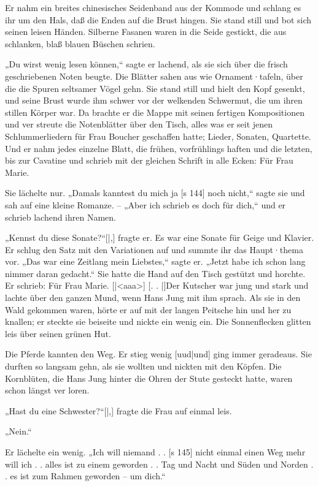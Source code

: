 Er nahm ein breites chinesisches Seidenband
aus der Kommode und schlang es ihr um den Hals,
daß die Enden auf die Brust hingen. Sie stand still
und bot sich seinen leisen Händen. Silberne Fasanen
waren in die Seide gestickt, die aus schlanken, blaß­
blauen Büschen schrien.

„Du wirst wenig lesen können,“ sagte er lachend,
als sie sich über die frisch geschriebenen Noten
beugte. Die Blätter sahen aus wie Ornament·tafeln,
über die die Spuren seltsamer Vögel gehn. Sie stand
still und hielt den Kopf gesenkt, und seine Brust
wurde ihm schwer vor der welkenden Schwermut,
die um ihren stillen Körper war. Da brachte er die
Mappe mit seinen fertigen Kompositionen und ver­
streute die Notenblätter über den Tisch, alles was
er seit jenen Schlummerliedern für Frau Boucher
geschaffen hatte; Lieder, Sonaten, Quartette. Und
er nahm jedes einzelne Blatt, die frühen, vorfrühlings­
haften und die letzten, bis zur Cavatine und schrieb
mit der gleichen Schrift in alle Ecken: Für Frau Marie.

Sie lächelte nur. „Damals kanntest du mich ja
[s 144]
noch nicht,“ sagte sie und sah auf eine kleine
Romanze. – „Aber ich schrieb es doch für dich,“
und er schrieb lachend ihren Namen.

„Kennst du diese Sonate?“[|,] fragte er. Es war
eine Sonate für Geige und Klavier. Er schlug den
Satz mit den Variationen auf und summte ihr das
Haupt·thema vor. „Das war eine Zeitlang mein
Liebstes,“ sagte er. „Jetzt habe ich schon lang nimmer
daran gedacht.“ Sie hatte die Hand auf den Tisch
gestützt und horchte. Er schrieb: Für Frau Marie.
[|<aaa>]
[. . |]Der Kutscher war jung und stark und lachte
über den ganzen Mund, wenn Hans Jung mit ihm
sprach. Als sie in den Wald gekommen waren, hörte
er auf mit der langen Peitsche hin und her zu knallen;
er steckte sie beiseite und nickte ein wenig ein. Die
Sonnenflecken glitten leis über seinen grünen Hut.

Die Pferde kannten den Weg. Er stieg wenig
[uud|und] ging immer geradeaus. Sie durften so langsam
gehn, als sie wollten und nickten mit den Köpfen.
Die Kornblüten, die Hans Jung hinter die Ohren
der Stute gesteckt hatte, waren schon längst ver­
loren.

„Hast du eine Schwester?“[|,] fragte die Frau auf
einmal leis.

„Nein.“

Er lächelte ein wenig. „Ich will niemand . .
[s 145]
nicht einmal einen Weg mehr will ich . . alles ist
zu einem geworden . . Tag und Nacht und Süden
und Norden . . es ist zum Rahmen geworden –
um dich.“

